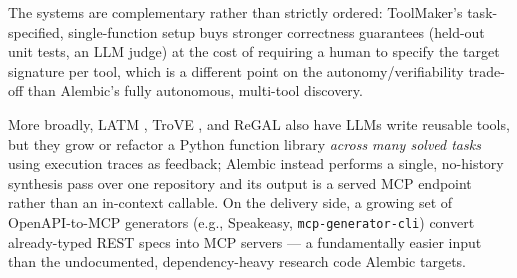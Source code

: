The systems are complementary rather than strictly ordered: ToolMaker's task-specified, single-function setup buys stronger correctness guarantees (held-out unit tests, an LLM judge) at the cost of requiring a human to specify the target signature per tool, which is a different point on the autonomy/verifiability trade-off than Alembic's fully autonomous, multi-tool discovery.

More broadly, LATM \citep{latm2024}, TroVE \citep{trove2024}, and ReGAL \citep{regal2024} also have LLMs write reusable tools, but they grow or refactor a Python function library \emph{across many solved tasks} using execution traces as feedback; Alembic instead performs a single, no-history synthesis pass over one repository and its output is a served MCP endpoint rather than an in-context callable. On the delivery side, a growing set of OpenAPI-to-MCP generators (e.g., Speakeasy, \texttt{mcp-generator-cli}) convert already-typed REST specs into MCP servers — a fundamentally easier input than the undocumented, dependency-heavy research code Alembic targets.

